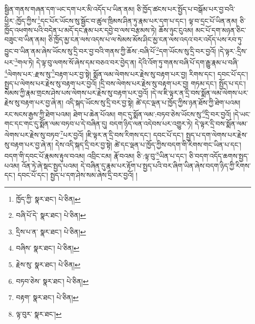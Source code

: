 སྦྱིན་གནས་གཞན་དག་ཡང་དག་པར་མི་འདོད་པ་ཡིན་ནམ། ཅི་ཁྱོད་ཚངས་པར་སྤྱོད་པ་བསྒོམ་པར་བྱ་བའི་ཕྱིར་:ཁྱོད་ཀྱིས་\footnote{ཁྱོད་ཀྱི་  སྣར་ཐང་།  པེ་ཅིན། }དང་པོར་ཡོངས་སུ་སྦྱོང་བ་ཚུལ་ཁྲིམས་ཤིན་ཏུ་རྣམ་པར་དག་པ་དང་། ལྟ་བ་དྲང་པོ་ཡིན་ནམ། ཅི་ཁྱོད་འཕགས་པའི་བདེན་པ་མདོ་དང་རྣམ་པར་དབྱེ་བ་ལས་བརྩམས་ཏེ། ཆོས་ཉུང་ངུའམ། མང་པོ་དག་མཉན་ཅིང་བཟུང་བ་ཡིན་ནམ། ཅི་ཁྱོད་མྱ་ངན་ལས་འདས་པ་ལ་སེམས་མོས་ཤིང་མྱ་ངན་ལས་འདའ་བར་འདོད་པས་རབ་ཏུ་བྱུང་བ་ཡིན་ནམ་ཞེས་ཡོངས་སུ་དྲི་བར་བྱ་བའི་གནས་ཀྱི་ཆོས་:བཞི་པོ་\footnote{བཞི་པོ་དེ་  སྣར་ཐང་།  པེ་ཅིན། }དག་ཡོངས་སུ་དྲི་བར་བྱའོ། །དེ་ལྟར་:དྲིས་པར་\footnote{དྲིས་པ་ན་  སྣར་ཐང་།  པེ་ཅིན། }གལ་ཏེ། དེ་ལྟ་བུ་ལགས་སོ་ཞེས་དམ་བཅའ་བར་བྱེད་ན། དེའི་འོག་ཏུ་གནས་བཞི་པོ་དག་རྒྱུ་རྣམ་པ་བཞི་\footnote{བཞིས་  སྣར་ཐང་།  པེ་ཅིན། }ལེགས་པར་:རྫས་སུ་\footnote{རྗེས་སུ་  སྣར་ཐང་།  པེ་ཅིན། }བརྟག་པར་བྱ་སྟེ། སྨོན་ལམ་ལེགས་པར་རྗེས་སུ་བརྟག་པར་བྱ། རིགས་དང་། དབང་པོ་དང་། སྤྱད་པ་ལེགས་པར་རྗེས་སུ་བརྟག་པར་བྱའོ། །དྲི་བས་ལེགས་པར་རྗེས་སུ་བརྟག་པར་བྱ། གཏམ་དང་། སྤྱོད་པ་དང་། སེམས་ཀྱི་རྣམ་གྲངས་ཤེས་པས་ལེགས་པར་རྗེས་སུ་བརྟག་པར་བྱའོ། །དེ་ལ་ཇི་ལྟར་ན་དྲི་བས་སྨོན་ལམ་ལེགས་པར་རྗེས་སུ་བརྟག་པར་བྱ་ཞེ་ན། འདི་སྐད་ཡོངས་སུ་དྲི་བར་བྱ་སྟེ། ཚེ་དང་ལྡན་པ་ཁྱོད་ཀྱིས་ཉན་ཐོས་ཀྱི་ཐེག་པའམ། རང་སངས་རྒྱས་ཀྱི་ཐེག་པའམ། ཐེག་པ་ཆེན་པོའམ། གང་དུ་སྨོན་ལམ་:བཏབ་ཅེས་ཡོངས་སུ་\footnote{བཏབ་ཅེས་  སྣར་ཐང་།  པེ་ཅིན། }དྲི་བར་བྱའོ། །དེ་ཡང་གང་དང་གང་དུ་སྨོན་ལམ་བཏབ་པ་དེ་བཞིན་དུ། བདག་ཉིད་ལན་འདེབས་པར་འགྱུར་ཏེ། དེ་ལྟར་དྲི་བས་སྨོན་ལམ་ལེགས་པར་རྗེས་སུ་བཏབ་\footnote{བརྟག་  སྣར་ཐང་།  པེ་ཅིན། }པར་བྱའོ། །ཇི་ལྟར་ན་དྲི་བས་རིགས་དང་། དབང་པོ་དང་། སྤྱད་པ་དག་ལེགས་པར་རྗེས་སུ་བརྟག་པར་བྱ་ཞེ་ན། དེས་འདི་སྐད་དྲི་བར་བྱ་སྟེ། ཚེ་དང་ལྡན་པ་ཁྱོད་ཀྱིས་བདག་གི་རིགས་གང་ཡིན་པ་དང་། བདག་གི་དབང་པོ་རྣམས་རྟུལ་བའམ། འབྲིང་ངམ། རྣོ་བའམ། ཅི་:ལྟ་བུ་\footnote{ལྟ་བུར་  སྣར་ཐང་། }ཡིན་པ་དང་། ཅི་བདག་འདོད་ཆགས་སྤྱད་པའམ། འོན་ཏེ་ཞེ་སྡང་སྤྱད་པའམ། དེ་བཞིན་དུ་རྣམ་པར་རྟོག་པ་སྤྱད་པའི་བར་ཞིག་ཡིན་ཞེས་བདག་ཉིད་ཀྱི་རིགས་དང་། དབང་པོ་དང་། སྤྱད་པ་དག་ཤེས་སམ་ཞེས་དྲི་བར་བྱའོ། །
